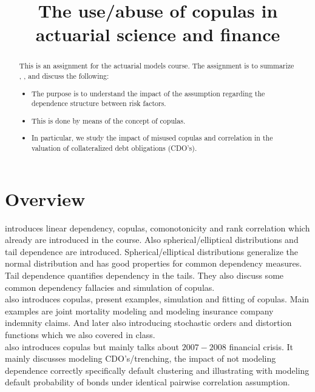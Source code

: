 \documentclass[a4paper,12pt]{article}
\title{The use/abuse of copulas in actuarial science and finance}
\date{}
\begin{document}
\maketitle

\begin{abstract}
    This is an assignment for the actuarial models course.
    The assignment is to summarize \cite{dempster_correlation_2002}, \cite{frees_understanding_1998},
    \cite{donnelly_devil_nodate} and discuss the following:

    \begin{itemize}
        \item  The purpose is to understand the impact of the assumption regarding
              the dependence structure between risk factors.
        \item  This is done by means of the concept of copulas.
        \item  In particular, we study the impact of misused copulas and correlation in the
              valuation of collateralized debt obligations (CDO's).
    \end{itemize}

\end{abstract}

\section{Overview}
\cite{dempster_correlation_2002} introduces linear dependency, copulas, comonotonicity and rank correlation which
already are introduced in the course. Also spherical/elliptical distributions and tail dependence are introduced.
Spherical/elliptical distributions generalize the normal distribution and has good properties for common dependency
measures.  Tail dependence quantifies dependency in the tails. They also discuss some
common dependency fallacies and simulation of copulas.\\

\cite{frees_understanding_1998} also introduces copulas, present examples, simulation
and fitting of copulas. Main examples are joint mortality modeling and modeling insurance company indemnity claims.
And later also introducing stochastic orders and distortion functions which we also covered in class. \\

\cite{donnelly_devil_nodate} also introduces copulas but mainly talks about $2007-2008$ financial crisis.
It mainly discusses modeling CDO's/trenching, the impact of not modeling dependence correctly specifically default
clustering and illustrating with modeling default probability of bonds under identical pairwise correlation
assumption.
\end{document}
